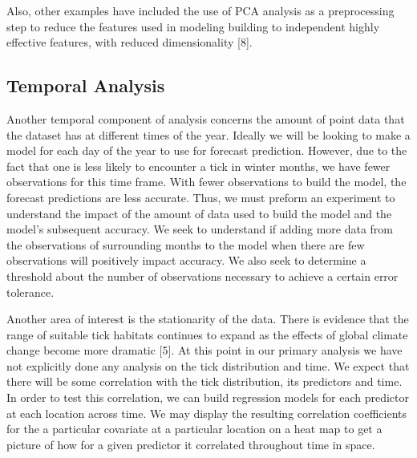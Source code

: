 \noindent Also, other examples have included the use of PCA analysis as a preprocessing step to reduce the features used in modeling building to independent highly effective features, with reduced dimensionality [8].   \newline


\subsection{Temporal Analysis}

\noindent Another temporal component of analysis concerns the amount of point data that the dataset has at different times of the year. Ideally we will be looking to make a model for each day of the year to use for forecast prediction. However, due to the fact that one is less likely to encounter a tick in winter months, we have fewer observations for this time frame. With fewer observations to build the model, the forecast predictions are less accurate.  Thus, we must preform an experiment to understand the impact of the amount of data used to build the model and the model's subsequent accuracy. We seek to understand if adding more data from the observations of surrounding months to the model when there are few observations will positively impact accuracy. We also seek to determine a threshold about the number of observations necessary to achieve a certain error tolerance. \newline

Another area of interest is the stationarity of the data. There is evidence that the range of suitable tick habitats continues to expand as the effects of global climate change become more dramatic [5]. At this point in our primary analysis we have not explicitly done any analysis on the tick distribution and time. We expect that there will be some correlation with the tick distribution, its predictors and time. In order to test this correlation, we can build regression models for each predictor at each location across time. We may display the resulting correlation coefficients for the a particular covariate at a particular location on a heat map to get a picture of how for a given predictor it correlated throughout time in space.  \newline




